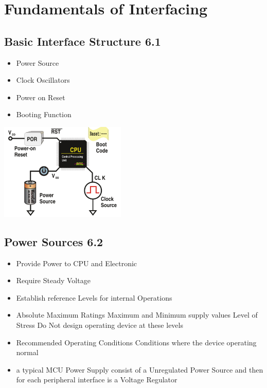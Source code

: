 \section{Fundamentals of Interfacing}
\subsection{Basic Interface Structure 6.1 }
\begin{minipage}{9cm}
	\begin{itemize}
		\item Power Source
		\item Clock Oscillators
		\item Power on Reset
		\item Booting Function
	\end{itemize}
\end{minipage}
\begin{minipage}{5cm}
	\includegraphics[width=6cm]{images/power.png}
\end{minipage}

\subsection{Power Sources 6.2 }
\begin{itemize}
	\item Provide Power to CPU and Electronic
	\item Require Steady Voltage
	\item Establish reference Levels for internal Operations
	\item Absolute Maximum Ratings
	\subitem Maximum and Minimum supply values
	\subitem Level of Stress
	\subitem Do Not design operating device at these levels
	\item Recommended Operating Conditions
	\subitem Conditions where the device operating normal
	\item a typical MCU Power Supply consist of a Unregulated Power Source and then for each peripheral interface is a Voltage Regulator
\end{itemize}
